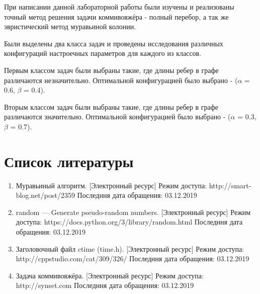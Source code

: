 \documentclass[12pt]{report}
\begin{document}
	При написании данной лабораторной работы были изучены и реализованы точный метод решения задачи коммивояжёра - полный перебор, а так же эвристический метод муравьиной колонии.
	
	Были выделены два класса задач и проведены исследования различных конфигураций настроечных параметров для каждого из классов.
	
	Первым классом задач были выбраны такие, где длины ребер в графе различаются незначительно.
	Оптимальной конфигурацией было выбрано - ($\alpha$ = 0.6, $\beta$ = 0.4).
	
	Вторым классом задач были выбраны такие, где длины ребер в графе различаются значительно.
	Оптимальной конфигурацией было выбрано - ($\alpha$ = 0.3, $\beta$ = 0.7).
	
	\chapter*{Список литературы}
	\begin{enumerate}
		\item Муравьиный алгоритм. [Электронный ресурс] Режим доступа: http://smart-blog.net/post/2359 Последння дата обращения: 03.12.2019
		\item random — Generate pseudo-random numbers. [Электронный ресурс] Режим доступа: https://docs.python.org/3/library/random.html Последння дата обращения: 03.12.2019
		\item Заголовочный файл ctime (time.h). [Электронный ресурс] Режим доступа: http://cppstudio.com/cat/309/326/ Последння дата обращения: 03.12.2019
		\item Задача коммивояжёра. [Электронный ресурс] Режим доступа: http://synset.com Последння дата обращения: 03.12.2019
	\end{enumerate}
	
		
	
	
		
	
	
	
	
	
	
	
	
	
	
	
	
	
	
	
	
	
	
	
	
	
	
	
	
	
	
	
	
	
	
	
	
	
\end{document}

